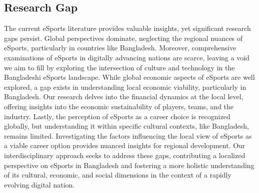 \documentclass[manuscript,screen,review,anonymous]{acmart}
\begin{document}
\subsection{Research Gap}


The current eSports literature provides valuable insights, yet significant research gaps persist. Global perspectives dominate, neglecting the regional nuances of eSports, particularly in countries like Bangladesh. Moreover, comprehensive examinations of eSports in digitally advancing nations are scarce, leaving a void we aim to fill by exploring the intersection of culture and technology in the Bangladeshi eSports landscape. While global economic aspects of eSports are well explored, a gap exists in understanding local economic viability, particularly in Bangladesh. Our research delves into the financial dynamics at the local level, offering insights into the economic sustainability of players, teams, and the industry. Lastly, the perception of eSports as a career choice is recognized globally, but understanding it within specific cultural contexts, like Bangladesh, remains limited. Investigating the factors influencing the local view of eSports as a viable career option provides nuanced insights for regional development. Our interdisciplinary approach seeks to address these gaps, contributing a localized perspective on eSports in Bangladesh and fostering a more holistic understanding of its cultural, economic, and social dimensions in the context of a rapidly evolving digital nation.

\end{document}
